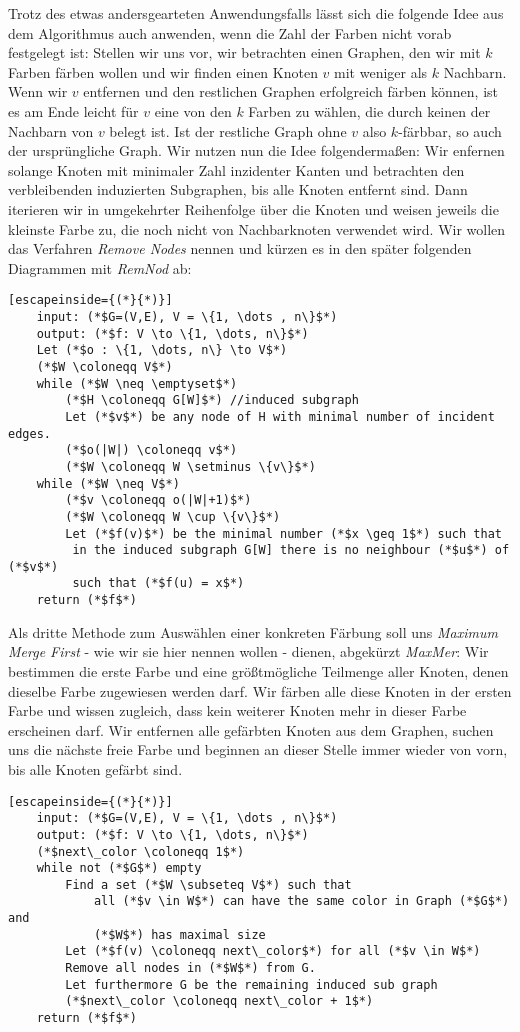 \documentclass[a4paper]{article}
\theoremstyle{nonumberplain}
\begin{document}
Trotz des etwas andersgearteten Anwendungsfalls lässt sich die folgende Idee aus dem Algorithmus auch anwenden, wenn die Zahl der Farben nicht vorab festgelegt ist: Stellen wir uns vor, wir betrachten einen Graphen, den wir mit $k$ Farben färben wollen und wir finden einen Knoten $v$ mit weniger als $k$ Nachbarn. Wenn wir $v$ entfernen und den restlichen Graphen erfolgreich färben können, ist es am Ende leicht für $v$ eine von den $k$ Farben zu wählen, die durch keinen der Nachbarn von $v$ belegt ist. Ist der restliche Graph ohne $v$ also $k$-färbbar, so auch der ursprüngliche Graph. Wir nutzen nun die Idee folgendermaßen: Wir enfernen solange Knoten mit minimaler Zahl inzidenter Kanten und betrachten den verbleibenden induzierten Subgraphen, bis alle Knoten entfernt sind. Dann iterieren wir in umgekehrter Reihenfolge über die Knoten und weisen jeweils die kleinste Farbe zu, die noch nicht von Nachbarknoten verwendet wird. Wir wollen das Verfahren \textit{Remove Nodes} nennen und kürzen es in den später folgenden Diagrammen mit \textit{RemNod} ab:
{
	\small
	\begin{lstlisting}[escapeinside={(*}{*)}]
	input: (*$G=(V,E), V = \{1, \dots , n\}$*)
	output: (*$f: V \to \{1, \dots, n\}$*)
	Let (*$o : \{1, \dots, n\} \to V$*)
	(*$W \coloneqq V$*)
	while (*$W \neq \emptyset$*)
		(*$H \coloneqq G[W]$*) //induced subgraph
		Let (*$v$*) be any node of H with minimal number of incident edges.
		(*$o(|W|) \coloneqq v$*)
		(*$W \coloneqq W \setminus \{v\}$*)
	while (*$W \neq V$*)
		(*$v \coloneqq o(|W|+1)$*)
		(*$W \coloneqq W \cup \{v\}$*)
		Let (*$f(v)$*) be the minimal number (*$x \geq 1$*) such that
		 in the induced subgraph G[W] there is no neighbour (*$u$*) of (*$v$*)
		 such that (*$f(u) = x$*)
	return (*$f$*)
	\end{lstlisting}
}

Als dritte Methode zum Auswählen einer konkreten Färbung soll uns \textit{Maximum Merge First} - wie wir sie hier nennen wollen - dienen, abgekürzt \textit{MaxMer}:
Wir bestimmen die erste Farbe und eine größtmögliche Teilmenge aller Knoten, denen dieselbe Farbe zugewiesen werden darf. Wir färben alle diese Knoten in der ersten Farbe und wissen zugleich, dass kein weiterer Knoten mehr in dieser Farbe erscheinen darf. Wir entfernen alle gefärbten Knoten aus dem Graphen, suchen uns die nächste freie Farbe und beginnen an dieser Stelle immer wieder von vorn, bis alle Knoten gefärbt sind.
{
	\small
	\begin{lstlisting}[escapeinside={(*}{*)}]
	input: (*$G=(V,E), V = \{1, \dots , n\}$*)
	output: (*$f: V \to \{1, \dots, n\}$*)
	(*$next\_color \coloneqq 1$*)
	while not (*$G$*) empty
		Find a set (*$W \subseteq V$*) such that
			all (*$v \in W$*) can have the same color in Graph (*$G$*) and
			(*$W$*) has maximal size
		Let (*$f(v) \coloneqq next\_color$*) for all (*$v \in W$*)
		Remove all nodes in (*$W$*) from G.
		Let furthermore G be the remaining induced sub graph
		(*$next\_color \coloneqq next\_color + 1$*)
	return (*$f$*)
	\end{lstlisting}
}
\end{document}
